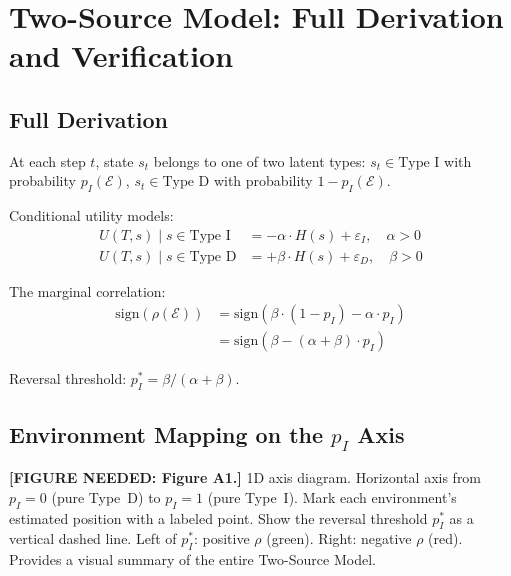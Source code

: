 \section{Two-Source Model: Full Derivation and Verification}
\label{app:model}

\subsection{Full Derivation}

At each step $t$, state $s_t$ belongs to one of two latent types:
$s_t \in \text{Type~I}$ with probability $p_I(\mathcal{E})$,
$s_t \in \text{Type~D}$ with probability $1 - p_I(\mathcal{E})$.

Conditional utility models:
\begin{align}
  U(T, s) \mid s \in \text{Type~I} &= -\alpha \cdot H(s) + \varepsilon_I, \quad \alpha > 0 \\
  U(T, s) \mid s \in \text{Type~D} &= +\beta \cdot H(s) + \varepsilon_D, \quad \beta > 0
\end{align}

The marginal correlation:
\begin{align}
  \mathrm{sign}(\rho(\mathcal{E})) &= \mathrm{sign}(\beta \cdot (1 - p_I) - \alpha \cdot p_I) \\
  &= \mathrm{sign}(\beta - (\alpha + \beta) \cdot p_I)
\end{align}

Reversal threshold: $p_I^* = \beta / (\alpha + \beta)$.

\subsection{Environment Mapping on the $p_I$ Axis}

{\color{red} \textbf{[FIGURE NEEDED: Figure A1.]} 1D axis diagram.
Horizontal axis from $p_I = 0$ (pure Type~D) to $p_I = 1$ (pure Type~I).
Mark each environment's estimated position with a labeled point.
Show the reversal threshold $p_I^*$ as a vertical dashed line.
Left of $p_I^*$: positive $\rho$ (green). Right: negative $\rho$ (red).
Provides a visual summary of the entire Two-Source Model.}

